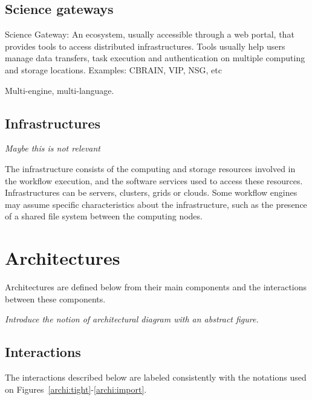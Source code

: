 \documentclass[preprint,3p,twocolumn]{elsarticle}
\newcommand{\todo}[1]{\color{blue}\xspace\emph{#1}\xspace\color{black}}
\begin{document}
\subsection{Science gateways}

Science Gateway: An ecosystem, usually accessible through a web
  portal, that provides tools to access distributed
  infrastructures. Tools usually help users manage data transfers,
  task execution and authentication on multiple computing and storage
  locations. Examples: CBRAIN, VIP, NSG, etc

Multi-engine, multi-language.


\subsection{Infrastructures}

\todo{Maybe this is not relevant}

The infrastructure consists of the computing and storage resources
involved in the workflow execution, and the software services used to
access these resources. Infrastructures can be servers, clusters,
grids or clouds. Some workflow engines may assume specific
characteristics about the infrastructure, such as the presence of a
shared file system between the computing nodes.

\section{Architectures}

Architectures are defined below from their main components and the
interactions between these components.

\todo{Introduce the notion of architectural diagram with an abstract figure.}


\subsection{Interactions}

The interactions described below are labeled consistently with the
notations used on Figures~\ref{archi:tight}-\ref{archi:import}.
\end{document}
